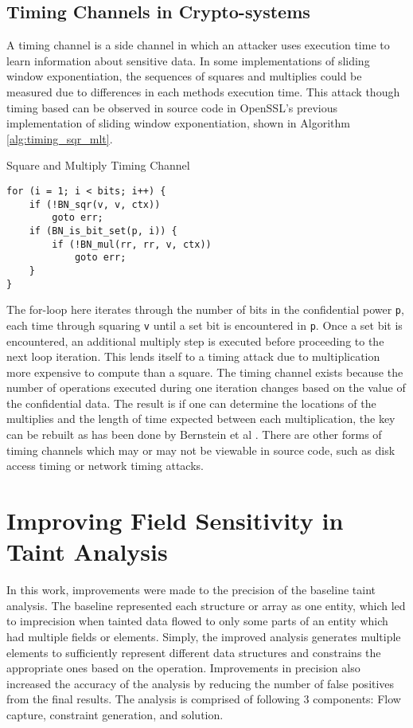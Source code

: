 \documentclass[11pt,a4paper]{article}
\begin{document}
\subsection{Timing Channels in Crypto-systems}

A timing channel is a side channel in which an attacker uses execution time to
learn information about sensitive data. In some implementations of sliding
window exponentiation, the sequences of squares and multiplies could be measured
due to differences in each methods execution time. This attack though timing
based can be observed in source code in OpenSSL's previous implementation of
sliding window exponentiation, shown in Algorithm \ref{alg:timing_sqr_mlt}. 

\begin{algorithm}
  \caption{Square and Multiply Timing Channel}
\begin{lstlisting}
for (i = 1; i < bits; i++) {
    if (!BN_sqr(v, v, ctx))
        goto err;
    if (BN_is_bit_set(p, i)) {
        if (!BN_mul(rr, rr, v, ctx))
            goto err;
    }
}
\end{lstlisting}
\label{alg:timing_sqr_mlt}
\end{algorithm}

The for-loop here iterates through the number of bits in the confidential power
\texttt{p}, each time through squaring \texttt{v} until a set bit is encountered
in \texttt{p}. Once a set bit is encountered, an additional multiply step is
executed before proceeding to the next loop iteration. This lends itself to a
timing attack due to multiplication more expensive to compute than a square. The
timing channel exists because the number of operations executed during one
iteration changes based on the value of the confidential data. The result is if
one can determine the locations of the multiplies and the length of time
expected between each multiplication, the key can be rebuilt as has been done
by Bernstein et al \cite{bernstein2017sliding}. There are other forms of timing
channels which may or may not be viewable in source code, such as disk access
timing or network timing attacks. 


\section{Improving Field Sensitivity in Taint Analysis}
In this work, improvements were made to the precision of the baseline taint
analysis. The baseline represented each structure or array as one entity, which
led to imprecision when tainted data flowed to only some parts of an entity
which had multiple fields or elements. Simply, the improved analysis generates
multiple elements to sufficiently represent different data structures and
constrains the appropriate ones based on the operation. Improvements in
precision also increased the accuracy of the analysis by reducing the number of
false positives from the final results. The analysis is comprised of following 3
components: Flow capture, constraint generation, and solution.
\end{document}
